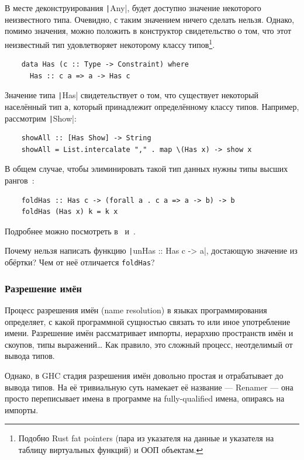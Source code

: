 В месте деконструирования \texttt|Any|, будет доступно значение некоторого неизвестного типа.
Очевидно, с таким значением ничего сделать нельзя.
Однако, помимо значения, можно положить в конструктор свидетельство о том, что этот неизвестный тип удовлетворяет некоторому классу типов\footnote{Подобно Rust fat pointers (пара из указателя на данные и указателя на таблицу виртуальных функций) и ООП объектам.}.
\begin{verbatim}
    data Has (c :: Type -> Constraint) where
      Has :: c a => a -> Has c
\end{verbatim}

Значение типа \texttt|Has| свидетельствует о том, что существует некоторый населённый тип \texttt{a}, который принадлежит определённому классу типов.
Например, рассмотрим \texttt|Show|:
\begin{verbatim}
    showAll :: [Has Show] -> String
    showAll = List.intercalate "," . map \(Has x) -> show x
\end{verbatim}

В общем случае, чтобы элиминировать такой тип данных нужны типы высших рангов~\cite[глава 24.3]{pierce2002types}:
\begin{verbatim}
    foldHas :: Has c -> (forall a . c a => a -> b) -> b
    foldHas (Has x) k = k x
\end{verbatim}

Подробнее можно посмотреть в~\cite[глава 7]{maguire-types} и~\cite[глава 24]{pierce2002types}.

\begin{task}
    Почему нельзя написать функцию \texttt|unHas :: Has c -> a|, достающую значение из обёртки?
    Чем от неё отличается \texttt{foldHas}?
\end{task}

\subsubsection{Разрешение имён} \label{subsubsec:resolve}

Процесс разрешения имён (name resolution) в языках программирования определяет, с какой программной сущностью связать то или иное употребление имени.
Разрешение имён рассматривает импорты, иерархию пространств имён и скоупов, типы выражений\ldots
Как правило, это сложный процесс, неотделимый от вывода типов.

Однако, в GHC стадия разрешения имён довольно простая и отрабатывает до вывода типов.
На её тривиальную суть намекает её название --- Renamer --- она просто переписывает имена в программе на fully-qualified имена, опираясь на импорты.

